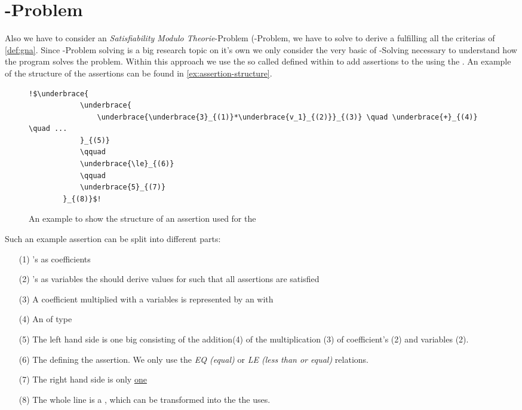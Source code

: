 \section{-Problem}
\label{sec:smt-problem}
Also we have to consider an \textit{Satisfiability Modulo Theorie}-Problem (-Problem, we have to solve to derive a \gna fulfilling all the criterias of \autoref{def:gna}. Since -Problem solving is a big research topic on it's own we only consider the very basic of -Solving necessary to understand how the program solves the problem. \newline
Within this approach we use the so called  defined within \aprove to add assertions to the \solver using the \smtfactory. An example of the structure of the assertions can be found in \autoref{ex:assertion-structure}. %

\begin{figure}[H]
	\begin{lstlisting}[escapechar = !]
		!$\underbrace{
			\underbrace{
				\underbrace{\underbrace{3}_{(1)}*\underbrace{v_1}_{(2)}}_{(3)} \quad \underbrace{+}_{(4)} \quad ...
			}_{(5)} 
			\qquad
			\underbrace{\le}_{(6)}
			\qquad
			\underbrace{5}_{(7)}
		}_{(8)}$!
	\end{lstlisting}
	\caption{An example to show the structure of an assertion used for the \solver}
	\label{ex:assertion-structure}
\end{figure}

Such an example assertion can be split into different parts: 
\begin{enumerate}
	\item[(1)] 's as coefficients
	\item[(2)] 's as variables the \solver should derive values for such that all assertions are satisfied
	\item[(3)] A coefficient multiplied with a variables is represented by an  with  
	\item[(4)] An  of type 
	\item[(5)] The left hand side is one big  consisting of the addition(4) of the multiplication (3) of coefficient's (2) and variables (2).
	\item[(6)] The  defining the assertion. We only use the \textit{EQ (equal)} or \textit{LE (less than or equal)} relations.
	\item[(7)] The right hand side is only \underline{one} 
	\item[(8)] The whole line is a , which can be transformed into the  the \solver uses.
\end{enumerate}

